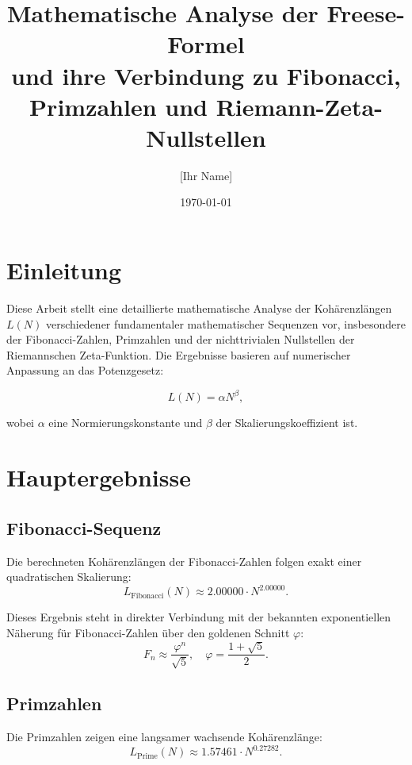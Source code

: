 \documentclass[a4paper,12pt]{article}
\title{Mathematische Analyse der Freese-Formel \\ und ihre Verbindung zu Fibonacci, Primzahlen und Riemann-Zeta-Nullstellen}
\author{[Ihr Name]}
\date{\today}
\begin{document}
\maketitle

\section{Einleitung}
Diese Arbeit stellt eine detaillierte mathematische Analyse der Kohärenzlängen $L(N)$ verschiedener fundamentaler mathematischer Sequenzen vor, insbesondere der Fibonacci-Zahlen, Primzahlen und der nichttrivialen Nullstellen der Riemannschen Zeta-Funktion. Die Ergebnisse basieren auf numerischer Anpassung an das Potenzgesetz:

\begin{equation}
L(N) = \alpha N^{\beta},
\end{equation}

wobei $\alpha$ eine Normierungskonstante und $\beta$ der Skalierungskoeffizient ist.

\section{Hauptergebnisse}

\subsection{Fibonacci-Sequenz}
Die berechneten Kohärenzlängen der Fibonacci-Zahlen folgen exakt einer quadratischen Skalierung:
\begin{equation}
L_{\text{Fibonacci}}(N) \approx 2.00000 \cdot N^{2.00000}.
\end{equation}

Dieses Ergebnis steht in direkter Verbindung mit der bekannten exponentiellen Näherung für Fibonacci-Zahlen über den goldenen Schnitt $\varphi$:
\begin{equation}
F_n \approx \frac{\varphi^n}{\sqrt{5}}, \quad \varphi = \frac{1 + \sqrt{5}}{2}.
\end{equation}

\subsection{Primzahlen}
Die Primzahlen zeigen eine langsamer wachsende Kohärenzlänge:
\begin{equation}
L_{\text{Prime}}(N) \approx 1.57461 \cdot N^{0.27282}.
\end{equation}
\end{document}
